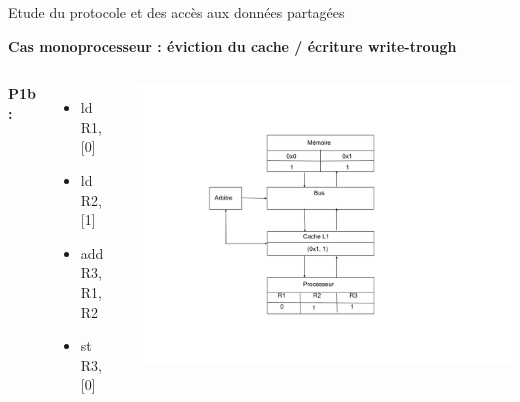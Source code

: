 \documentclass{beamer}
\begin{document}
\begin{frame}{Etude du protocole et des accès aux données partagées}
    \addtocounter{framenumber}{-1}
    \textbf{Cas monoprocesseur : éviction du cache / écriture write-trough}
    \begin{columns}[c] %

        \textbf{P1b : }
        \begin{itemize}
            \item ld R1, [0]
            \item ld R2, [1]
            \item add R3, R1, R2
            \item st R3, [0] 
        \end{itemize}

        \includegraphics[scale=0.28]{f4b.png}
        
    \end{columns}
\end{frame}

\end{document}

